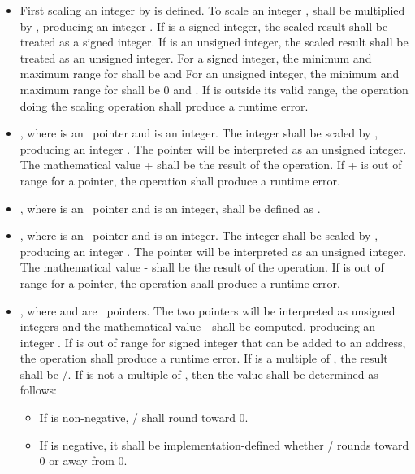 \begin{itemize}
\item
  First scaling an integer by  is
  defined. To scale an integer ,  shall be multiplied by
  , producing an integer . If
   is a signed integer, the scaled result shall be treated as a
  signed integer. If  is an unsigned integer, the scaled result
  shall be treated as an unsigned integer. For a signed integer, the
  minimum and maximum range for  shall be  and
   For an unsigned integer, the minimum and maximum
  range for  shall be 0 and . If  is
  outside its valid range, the operation doing the scaling operation
  shall produce a runtime error.
\item
   \code{+} , where  is an
  \arrayptrT\ pointer
  and  is an integer. The integer  shall be scaled by
  , producing an integer . The
  pointer  will be interpreted as an unsigned integer. The mathematical
  value  +  shall be the result of the operation. If
   +  is out of range for a pointer, the operation shall
  produce a runtime error.
\item
   \code{+} , where  is an
  \arrayptrT\ pointer
  and  is an integer, shall be defined as  \code{+}
  .
\item
   \code{-} , where  is an
  \arrayptrT\ pointer
  and  is an integer. The integer  shall be scaled by
  , producing an integer . The
  pointer  will be interpreted as an unsigned integer. The
  mathematical value  -  shall be the result of the
  operation. If   is out of range for a pointer, the
  operation shall produce a runtime error.
\item
   \code{-} , where  and  are
  \arrayptrT\
  pointers. The two pointers will be interpreted as unsigned integers
  and the mathematical value \var{p} - \var{q} shall be computed,
  producing an integer . If  is out of range for signed
  integer that can be added to an address, the operation shall produce a
  runtime error. If  is a multiple of
  , the result shall be
  /. If \var{j} is not a
  multiple of \sizeof{\var{T}}, then the value shall
  be determined as follows:

  \begin{itemize}
  \item
    If  is non-negative,
    \var{j}/ shall round toward 0.
  \item
    If  is negative, it shall be implementation-defined whether
    \var{j}/\sizeof{\var{T}} rounds toward 0 or away
    from 0.
  \end{itemize}
\end{itemize}

